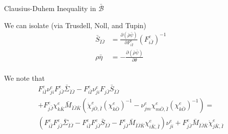 \documentclass[11pt]{beamer}
\begin{document}
\begin{frame}{Clausius-Duhem Inequality in $\bar{\mathcal{B}}$}

We can isolate (via Trusdell, Noll, and Tupin)
\begin{align*}
\bar{S}_{\bar{I}\bar{J}} &= \frac{\partial\left(\bar{\rho}\bar{\psi}\right)}{\partial F_{i\bar{I}}^e} \left(F_{i\bar{J}}^e\right)^{-1}\\
\rho \bar{\eta} &= - \frac{\partial \left(\bar{\rho} \bar{\psi}\right)}{\partial \theta}\\
\end{align*}

We note that
\begin{align*}
F_{i\bar{I}}^e \nu_{ji}^e F_{j\bar{J}}^e \bar{\Sigma}_{\bar{I}\bar{J}} - F_{i\bar{I}}^e \nu_{ji}^e F_{j\bar{J}} \bar{S}_{\bar{I}\bar{J}}\\
+ F_{j\bar{J}}^e \chi_{k\bar{K}}^e \bar{M}_{\bar{I}\bar{J}\bar{K}}\left(\dot{\chi}_{j\bar{O},\bar{I}}^e \left(\chi_{k\bar{O}}^e\right)^{-1} - \nu_{jm}^e \chi_{m\bar{O},\bar{I}}^e \left(\chi_{k\bar{O}}^e\right)^{-1}\right) = \\
\left(F_{i\bar{I}}^e  F_{j\bar{J}}^e \bar{\Sigma}_{\bar{I}\bar{J}} - F_{i\bar{I}}^e F_{j\bar{J}}^e \bar{S}_{\bar{I}\bar{J}} - F_{j\bar{J}}^e\bar{M}_{\bar{I}\bar{J}\bar{K}} \chi_{i\bar{K},\bar{I}}^e\right)\nu_{ji}^e + F_{j\bar{J}}^e\bar{M}_{\bar{I}\bar{J}\bar{K}} \dot{\chi}_{j\bar{K},\bar{I}}^e\\
\end{align*}

\end{frame}
\end{document}

